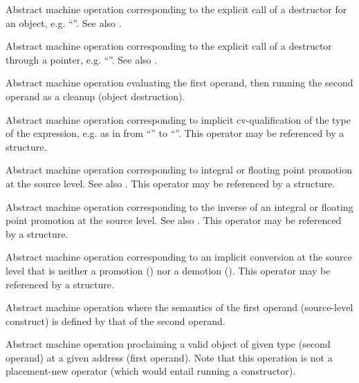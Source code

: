 


Abstract machine operation corresponding to the explicit call of a destructor for an object, e.g. ``''.
See also .

Abstract machine operation corresponding to the explicit call of a destructor through a pointer, e.g. ``''.
See also .

Abstract machine operation evaluating the first operand, then running the second operand as a cleanup (object destruction).

Abstract machine operation corresponding to implicit cv-qualification of the type of the expression, 
e.g. as in from ``'' to ``''.
This operator may be referenced by a  structure.

Abstract machine operation corresponding to integral or floating point promotion at the source level.
See also . This operator may be referenced by a 
structure.

Abstract machine operation corresponding to the inverse of an integral or floating point promotion at the source level.
See also . This operator may be referenced by a 
structure.

Abstract machine operation corresponding to an implicit conversion at the source level that is neither 
a promotion () nor a demotion ().
This operator may be referenced by a  structure.

Abstract machine operation where the semantics of the first operand (source-level construct) is defined by that of the second operand.

Abstract machine operation proclaiming a valid object of given type (second operand) at a given address (first operand).  
Note that this operation is not a placement-new operator (which would entail running a constructor).

